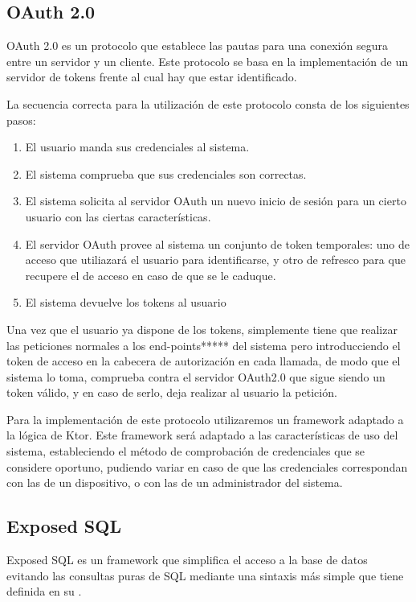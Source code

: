     \subsection{OAuth 2.0}
    
OAuth 2.0 es un protocolo que establece las pautas para una conexión segura entre un servidor y un cliente.
Este protocolo se basa en la implementación de un servidor de tokens frente al cual hay que estar identificado.

La secuencia correcta para la utilización de este protocolo consta de los siguientes pasos:

\begin{enumerate}
        \item El usuario manda sus credenciales al sistema.
        \item El sistema comprueba que sus credenciales son correctas.
        \item El sistema solicita al servidor OAuth un nuevo inicio de sesión para un cierto usuario con las ciertas características.
        \item El servidor OAuth provee al sistema un conjunto de token temporales: uno de acceso que utiliazará el usuario para identificarse, y otro de refresco para que recupere el de acceso en caso de que se le caduque.
        \item El sistema devuelve los tokens al usuario
\end{enumerate}
Una vez que el usuario ya dispone de los tokens, simplemente tiene que realizar las peticiones normales a los end-points***** del sistema pero introducciendo el token de acceso en la cabecera de autorización en cada llamada, de modo que el sistema lo toma, comprueba contra el servidor OAuth2.0 que sigue siendo un token válido, y en caso de serlo, deja realizar al usuario la petición.

Para la implementación de este protocolo utilizaremos un framework adaptado a la lógica de Ktor. 
Este framework será adaptado a las características de uso del sistema, estableciendo el método de comprobación de credenciales que se considere oportuno, pudiendo variar en caso de que las credenciales correspondan con las de un dispositivo, o con las de un administrador del sistema.

    \subsection{Exposed SQL}

Exposed SQL es un framework que simplifica el acceso a la base de datos evitando las consultas puras de SQL mediante una sintaxis más simple que tiene definida en su .

